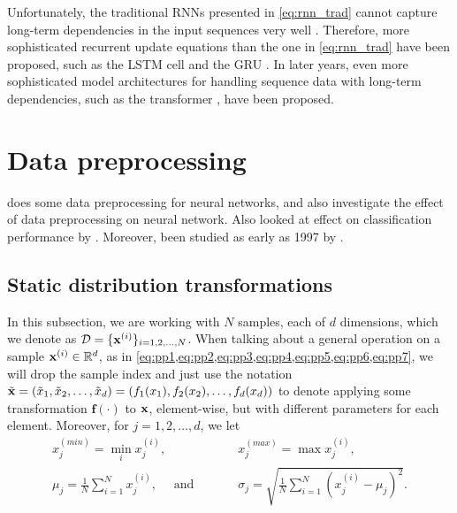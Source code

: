 \documentclass{statsmsc}
\begin{document}
{Unfortunately, the traditional \acp{RNN} presented in \cref{eq:rnn_trad} cannot
capture long-term dependencies in the input sequences very well
\citep{long_term_dep}. Therefore, more sophisticated recurrent update equations
than the one in \cref{eq:rnn_trad} have been proposed, such as the \ac{LSTM}
cell \citep{lstm} and the \ac{GRU} \citep{gru_cho}.
In later years, even more sophisticated model architectures for handling sequence data with
long-term dependencies, such as the transformer \citep{attention}, have been proposed.


\section{Data preprocessing}%
\label{sec:Data preprocessing}

\cite{stanislav} does some data preprocessing for neural networks, and
\cite{nawi} also investigate the effect of data preprocessing on neural network.
Also looked at effect on classification performance by \cite{singh}.
Moreover, been studied as early as 1997 by \citep{preprocess_origin}.

\subsection{Static distribution transformations}%
\label{sub:Static distribution transformations}

In this subsection, we are working with $N$ samples, each of $d$ dimensions, which we
denote as $\mathcal{D}=\{\mathbf{x}^{(i)} \}_{i=1,2,\dots,N}$. When talking about a general operation
on a sample $\mathbf{x}^{(i)}\in\mathbb{R}^d$, as in \cref{eq:pp1,eq:pp2,eq:pp3,eq:pp4,eq:pp5,eq:pp6,eq:pp7},
we will drop the sample index and just use the notation
$\tilde{\mathbf{x}}=\left(\tilde{x}_1,\tilde{x}_2,\dots,\tilde{x}_d \right)
=(f_1(x_1), f_2(x_2),\dots,f_d(x_d))$ to denote applying some transformation $\mathbf{f}(\cdot)$ to
$\mathbf{x}$, element-wise, but with different parameters for each element.
Moreover, for $j=1,2,\dots,d$, we let
\begin{align}
    x_j^{(min)}=\min_i x^{(i)}_j,  \qquad\qquad&\quad
    x_j^{(max)}=\max x^{(i)}_j, \nonumber\\
    \mu_j = \frac{1}{N} \sum^{N}_{i=1} x^{(i)}_j, \quad
    \textrm{ and }&\quad
    \sigma_j = \sqrt{\frac{1}{N} \sum^{N}_{i=1} \left( x^{(i)}_j - \mu_j\right)^2}.
\end{align}

}
\end{document}
